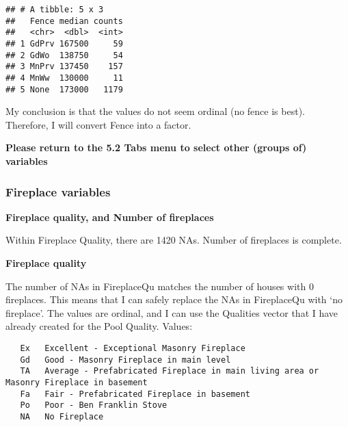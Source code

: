 \documentclass[]{article}
\newenvironment{Shaded}{\begin{snugshade}}{\end{snugshade}}
\newcommand{\KeywordTok}[1]{\textcolor[rgb]{0.13,0.29,0.53}{\textbf{#1}}}
\newcommand{\StringTok}[1]{\textcolor[rgb]{0.31,0.60,0.02}{#1}}
\newcommand{\OperatorTok}[1]{\textcolor[rgb]{0.81,0.36,0.00}{\textbf{#1}}}
\newcommand{\NormalTok}[1]{#1}
\begin{document}
\begin{verbatim}
## # A tibble: 5 x 3
##   Fence median counts
##   <chr>  <dbl>  <int>
## 1 GdPrv 167500     59
## 2 GdWo  138750     54
## 3 MnPrv 137450    157
## 4 MnWw  130000     11
## 5 None  173000   1179
\end{verbatim}

My conclusion is that the values do not seem ordinal (no fence is best).
Therefore, I will convert Fence into a factor.

\begin{Shaded}
\end{Shaded}

\textbf{Please return to the 5.2 Tabs menu to select other (groups of)
variables}

\subsubsection{Fireplace variables}\label{fireplace-variables}

\textbf{Fireplace quality, and Number of fireplaces}

Within Fireplace Quality, there are 1420 NAs. Number of fireplaces is
complete.

\textbf{Fireplace quality}

The number of NAs in FireplaceQu matches the number of houses with 0
fireplaces. This means that I can safely replace the NAs in FireplaceQu
with `no fireplace'. The values are ordinal, and I can use the Qualities
vector that I have already created for the Pool Quality. Values:

\begin{verbatim}
   Ex   Excellent - Exceptional Masonry Fireplace
   Gd   Good - Masonry Fireplace in main level
   TA   Average - Prefabricated Fireplace in main living area or Masonry Fireplace in basement
   Fa   Fair - Prefabricated Fireplace in basement
   Po   Poor - Ben Franklin Stove
   NA   No Fireplace
\end{verbatim}

\begin{Shaded}
\end{Shaded}
\end{document}
